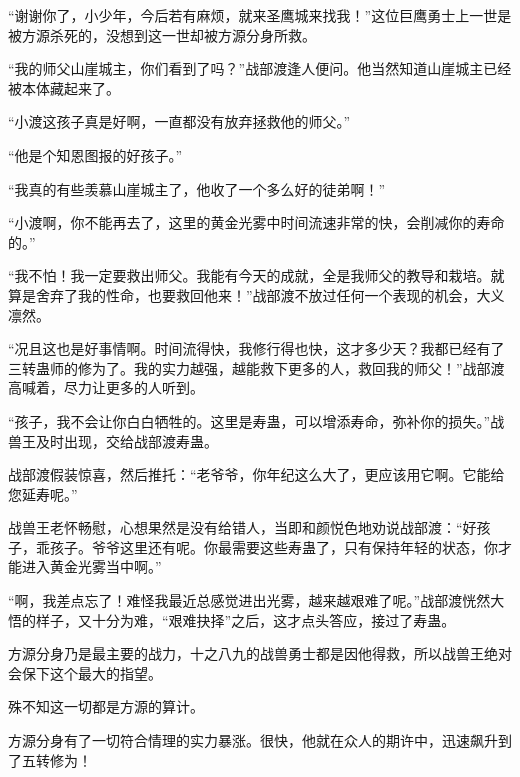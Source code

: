 \begin{this_body}
“谢谢你了，小少年，今后若有麻烦，就来圣鹰城来找我！”这位巨鹰勇士上一世是被方源杀死的，没想到这一世却被方源分身所救。

“我的师父山崖城主，你们看到了吗？”战部渡逢人便问。他当然知道山崖城主已经被本体藏起来了。

“小渡这孩子真是好啊，一直都没有放弃拯救他的师父。”

“他是个知恩图报的好孩子。”

“我真的有些羡慕山崖城主了，他收了一个多么好的徒弟啊！”

“小渡啊，你不能再去了，这里的黄金光雾中时间流速非常的快，会削减你的寿命的。”

“我不怕！我一定要救出师父。我能有今天的成就，全是我师父的教导和栽培。就算是舍弃了我的性命，也要救回他来！”战部渡不放过任何一个表现的机会，大义凛然。

“况且这也是好事情啊。时间流得快，我修行得也快，这才多少天？我都已经有了三转蛊师的修为了。我的实力越强，越能救下更多的人，救回我的师父！”战部渡高喊着，尽力让更多的人听到。

“孩子，我不会让你白白牺牲的。这里是寿蛊，可以增添寿命，弥补你的损失。”战兽王及时出现，交给战部渡寿蛊。

战部渡假装惊喜，然后推托：“老爷爷，你年纪这么大了，更应该用它啊。它能给您延寿呢。”

战兽王老怀畅慰，心想果然是没有给错人，当即和颜悦色地劝说战部渡：“好孩子，乖孩子。爷爷这里还有呢。你最需要这些寿蛊了，只有保持年轻的状态，你才能进入黄金光雾当中啊。”

“啊，我差点忘了！难怪我最近总感觉进出光雾，越来越艰难了呢。”战部渡恍然大悟的样子，又十分为难，“艰难抉择”之后，这才点头答应，接过了寿蛊。

方源分身乃是最主要的战力，十之八九的战兽勇士都是因他得救，所以战兽王绝对会保下这个最大的指望。

殊不知这一切都是方源的算计。

方源分身有了一切符合情理的实力暴涨。很快，他就在众人的期许中，迅速飙升到了五转修为！

\end{this_body}

